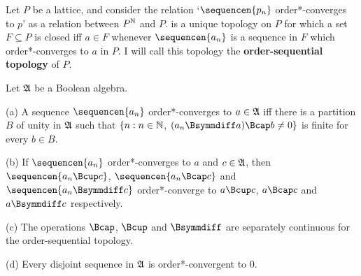  Let $P$ be a lattice, and consider the
relation `$\sequencen{p_n}$ order*-converges to $p$' as a relation
between $P^{\Bbb N}$ and $P$.
 is a unique topology on $P$ for which a set
$F\subseteq P$ is closed iff $a\in F$ whenever $\sequencen{a_n}$ is a
sequence in $F$ which order*-converges to $a$ in $P$.
I will call this topology the {\bf order-sequential topology} of $P$.


 Let $\frak A$ be a Boolean algebra.

(a) A sequence $\sequencen{a_n}$ order*-converges to $a\in\frak A$ iff
there is a partition $B$ of unity in $\frak A$ such that
$\{n:n\in\Bbb N$, $(a_n\Bsymmdiff a)\Bcap b\ne 0\}$ is finite for every
$b\in B$.

(b) If $\sequencen{a_n}$ order*-converges to $a$ and $c\in\frak A$, then
$\sequencen{a_n\Bcup c}$,
$\sequencen{a_n\Bcap c}$ and $\sequencen{a_n\Bsymmdiff c}$
order*-converge to
$a\Bcup c$, $a\Bcap c$ and $a\Bsymmdiff c$ respectively.

(c) The operations $\Bcap$, $\Bcup$ and $\Bsymmdiff$ are separately
continuous for the order-sequential topology.

(d) Every disjoint sequence in $\frak A$ is order*-convergent to $0$.

